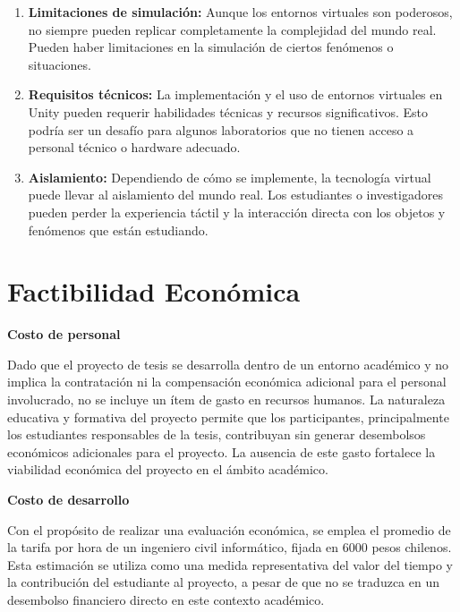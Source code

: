 \begin{enumerate}
    \item \textbf{Limitaciones de simulación:} Aunque los entornos virtuales son poderosos, no siempre pueden replicar completamente la complejidad del mundo real. Pueden haber limitaciones en la simulación de ciertos fenómenos o situaciones.
    
    \item \textbf{Requisitos técnicos:} La implementación y el uso de entornos virtuales en Unity pueden requerir habilidades técnicas y recursos significativos. Esto podría ser un desafío para algunos laboratorios que no tienen acceso a personal técnico o hardware adecuado.
    
    \item \textbf{Aislamiento:} Dependiendo de cómo se implemente, la tecnología virtual puede llevar al aislamiento del mundo real. Los estudiantes o investigadores pueden perder la experiencia táctil y la interacción directa con los objetos y fenómenos que están estudiando.
    
\end{enumerate}

\section{Factibilidad Económica}

\textbf{Costo de personal}

Dado que el proyecto de tesis se desarrolla dentro de un entorno académico y no implica la contratación ni la compensación económica adicional para el personal involucrado, no se incluye un ítem de gasto en recursos humanos. La naturaleza educativa y formativa del proyecto permite que los participantes, principalmente los estudiantes responsables de la tesis, contribuyan sin generar desembolsos económicos adicionales para el proyecto. La ausencia de este gasto fortalece la viabilidad económica del proyecto en el ámbito académico.

\textbf{Costo de desarrollo}

Con el propósito de realizar una evaluación económica, se emplea el promedio de la tarifa por hora de un ingeniero civil informático, fijada en 6000 pesos chilenos. Esta estimación se utiliza como una medida representativa del valor del tiempo y la contribución del estudiante al proyecto, a pesar de que no se traduzca en un desembolso financiero directo en este contexto académico.

